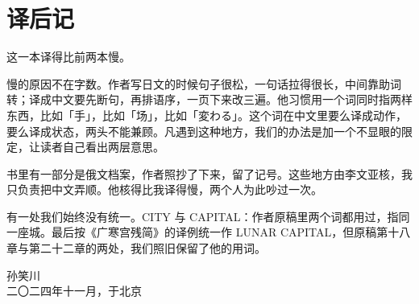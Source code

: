 \endgroup

\clearpage

\chapter*{译\quad 后\quad 记}
{}

\noindent
这一本译得比前两本慢。

慢的原因不在字数。作者写日文的时候句子很松，一句话拉得很长，中间靠助词转；译成中文要先断句，再排语序，一页下来改三遍。他习惯用一个词同时指两样东西，比如「手」，比如「场」，比如「変わる」。这个词在中文里要么译成动作，要么译成状态，两头不能兼顾。凡遇到这种地方，我们的办法是加一个不显眼的限定，让读者自己看出两层意思。

书里有一部分是俄文档案，作者照抄了下来，留了记号。这些地方由李文亚核，我只负责把中文弄顺。他核得比我译得慢，两个人为此吵过一次。

有一处我们始终没有统一。CITY 与 CAPITAL：作者原稿里两个词都用过，指同一座城。最后按《广寒宫残简》的译例统一作 LUNAR CAPITAL，但原稿第十八章与第二十二章的两处，我们照旧保留了他的用词。

\begin{flushright}
{\small 孙笑川}\\[2mm]
{\footnotesize\color{pencil} 二〇二四年十一月，于北京}
\end{flushright}
